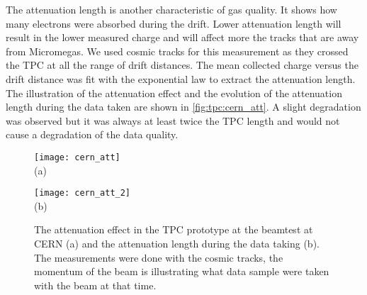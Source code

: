\documentclass[../main.tex]{subfiles}
\begin{document}
The attenuation length is another characteristic of gas quality. It shows how many electrons were absorbed during the drift. Lower attenuation length will result in the lower measured charge and will affect more the tracks that are away from Micromegas. We used cosmic tracks for this measurement as they crossed the TPC at all the range of drift distances. The mean collected charge versus the drift distance was fit with the exponential law to extract the attenuation length. The illustration of the attenuation effect and the evolution of the attenuation length during the data taken are shown in \autoref{fig:tpc:cern_att}. A slight degradation was observed but it was always at least twice the TPC length and would not cause a degradation of the data quality.

\begin{figure}[!ht]
  \centering
  \begin{minipage}{0.49\linewidth}
    \centering
    \texttt{[image: cern\_att]} \\ (a)
  \end{minipage}
  \begin{minipage}{0.49\linewidth}
    \centering
    \texttt{[image: cern\_att\_2]} \\ (b)
  \end{minipage}
  \caption{The attenuation effect in the TPC prototype at the beamtest at CERN (a) and the attenuation length during the data taking (b). The measurements were done with the cosmic tracks, the momentum of the beam is illustrating what data sample were taken with the beam at that time.}
  \label{fig:tpc:cern_att}
\end{figure}
\end{document}
